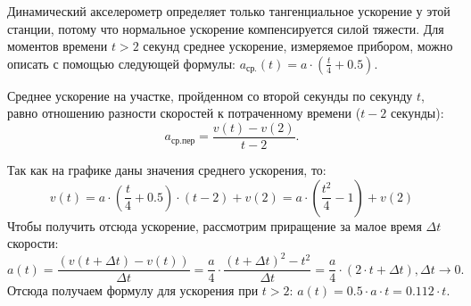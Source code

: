 Динамический акселерометр определяет только тангенциальное ускорение у этой станции, потому что нормальное ускорение компенсируется 
силой тяжести. Для моментов времени $t > 2$ секунд среднее ускорение, измеряемое прибором, можно описать с помощью следующей формулы:  
$a_{\text{ср.}}(t)=a \cdot (\frac{t}{4}+0.5)$.

Среднее ускорение на участке, пройденном со второй секунды по секунду $t$, равно отношению разности скоростей к потраченному 
времени ($t - 2$ секунды):
$$a_{\text{ср.пер}}=\dfrac{v(t)-v(2)}{t-2}.$$

Так как на графике даны значения среднего ускорения, то: 
$$v(t)=a \cdot \left(\frac{t}{4}+0.5\right) \cdot (t-2)+v(2)=a \cdot \left(\dfrac{t^2}{4}-1\right)+v(2) $$
Чтобы получить отсюда ускорение, рассмотрим приращение за малое время $\Delta t$ скорости:
$$a(t)=\dfrac{(v(t+\Delta t)-v(t))}{\Delta t}=\dfrac{a}{4} \cdot \dfrac{(t+\Delta t)^2-t^2}{\Delta t}=\dfrac{a}{4} \cdot (2 \cdot t+\Delta t),\Delta t \rightarrow 0.$$
Отсюда получаем формулу для ускорения при $t>2$:  $a(t)=0.5 \cdot a \cdot t=0.112 \cdot t$.

